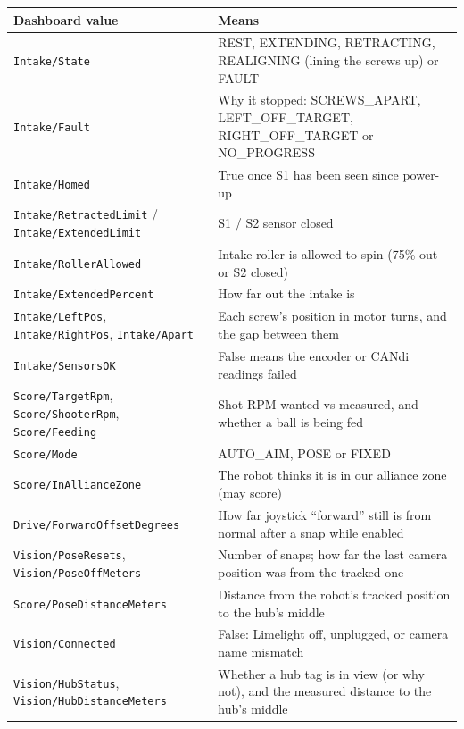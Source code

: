 \documentclass[11pt]{article}
\newcommand{\dash}[1]{\texttt{#1}}
\begin{document}
\begin{xltabular}{\linewidth}{>{\raggedright\arraybackslash}p{6.2cm} L}
\toprule
\textbf{Dashboard value} & \textbf{Means} \\
\midrule
\endhead
\dash{Intake/State} & REST, EXTENDING, RETRACTING, REALIGNING (lining the screws up) or FAULT \\
\dash{Intake/Fault} & Why it stopped: SCREWS\_APART, LEFT\_OFF\_TARGET, RIGHT\_OFF\_TARGET or NO\_PROGRESS \\
\dash{Intake/Homed} & True once S1 has been seen since power-up \\
\dash{Intake/RetractedLimit} / \dash{Intake/ExtendedLimit} & S1 / S2 sensor closed \\
\dash{Intake/RollerAllowed} & Intake roller is allowed to spin (75\% out or S2 closed) \\
\dash{Intake/ExtendedPercent} & How far out the intake is \\
\dash{Intake/LeftPos}, \dash{Intake/RightPos}, \dash{Intake/Apart} & Each screw's position in motor turns, and the gap between them \\
\dash{Intake/SensorsOK} & False means the encoder or CANdi readings failed \\
\dash{Score/TargetRpm}, \dash{Score/ShooterRpm}, \dash{Score/Feeding} & Shot RPM wanted vs measured, and whether a ball is being fed \\
\dash{Score/Mode} & AUTO\_AIM, POSE or FIXED \\
\dash{Score/InAllianceZone} & The robot thinks it is in our alliance zone (may score) \\
\dash{Drive/ForwardOffsetDegrees} & How far joystick ``forward'' still is from normal after a snap while enabled \\
\dash{Vision/PoseResets}, \dash{Vision/PoseOffMeters} & Number of snaps; how far the last camera position was from the tracked one \\
\dash{Score/PoseDistanceMeters} & Distance from the robot's tracked position to the hub's middle \\
\dash{Vision/Connected} & False: Limelight off, unplugged, or camera name mismatch \\
\dash{Vision/HubStatus}, \dash{Vision/HubDistanceMeters} & Whether a hub tag is in view (or why not), and the measured distance to the hub's middle \\
\bottomrule
\end{xltabular}
\end{document}
